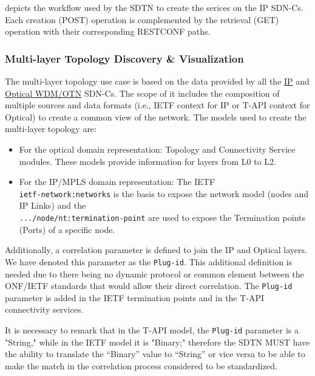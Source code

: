 \documentclass[a4paper,fleqn]{cas-dc}
\begin{document}
 depicts the workflow used by the SDTN to create the serices on the IP SDN-Cs. Each creation (POST) operation is complemented by the retrieval (GET) operation with their corresponding RESTCONF paths. 


\subsubsection{Multi-layer Topology Discovery \& Visualization}

The multi-layer topology use case is based on the data provided by all the \hyperref[subsection:IPtopo]{IP} and \hyperref[subsection:OPTopo]{Optical WDM/OTN} SDN-Cs. The scope of it includes the composition of multiple sources and data formats (i.e., IETF context for IP or T-API context for Optical) to create a common view of the network. The models used to create the multi-layer topology are:
\begin{itemize}
    \item For the optical domain representation: Topology and Connectivity Service modules. These models provide information for layers from L0 to L2.
    \item For the IP/MPLS domain representation: The IETF\\ \texttt{ietf-network:networks} is the basis to expose the network model (nodes and IP Links) and the \\ \texttt{.../node/nt:termination-point} are used to expose the Termination points (Ports) of a specific node.
\end{itemize}
    
Additionally, a correlation parameter is defined to join the IP and Optical layers. We have denoted this parameter as the \texttt{Plug-id}. This additional definition is needed due to there being no dynamic protocol or common element between the ONF/IETF standards that would allow their direct correlation. The \texttt{Plug-id} parameter is added in the IETF termination points and in the T-API connectivity services. 

It is necessary to remark that in the T-API model, the \texttt{Plug-id} parameter is a "String," while in the IETF model it is "Binary;" therefore the SDTN MUST have the ability to translate the “Binary” value to “String” or vice versa to be able to make the match in the correlation process considered to be standardized.
\end{document}

